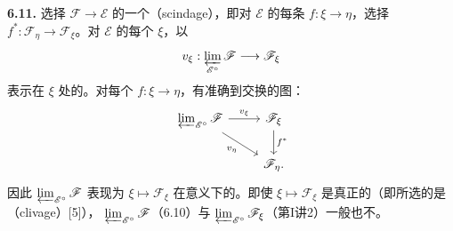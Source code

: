 \textbf{6.11.} 选择 $\mathscr F\to\mathscr E$ 的一个（scindage），即对 $\mathscr E$ 的每条 $f:\xi\to\eta$，选择 $f^*:\mathscr F_\eta\to\mathscr F_\xi$。对 $\mathscr E$ 的每个 $\xi$，以
\[
v_\xi:\varprojlim_{\mathscr E^{\circ}}\mathscr F\longrightarrow\mathscr F_\xi
\]
表示在 $\xi$ 处的。对每个 $f:\xi\to\eta$，有准确到交换的图：
\[
\begin{tikzcd}
\varprojlim_{\mathscr E^{\circ}}\mathscr F\arrow[r,"v_\xi"]\arrow[dr,"v_\eta"']&\mathscr F_\xi\arrow[d,"f^*"]\\
&\mathscr F_\eta.
\end{tikzcd}
\]
因此 $\varprojlim_{\mathscr E^{\circ}}\mathscr F$ 表现为 $\xi\mapsto\mathscr F_\xi$ 在意义下的。即使 $\xi\mapsto\mathscr F_\xi$ 是真正的（即所选的是（clivage）[5]）， $\varprojlim_{\mathscr E^{\circ}}\mathscr F$（6.10）与 $\varprojlim_{\mathscr E^{\circ}}\mathscr F_\xi$（第I讲2）一般也不。
